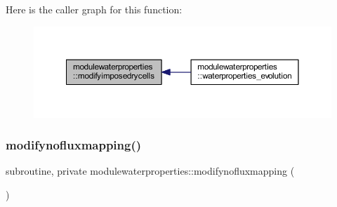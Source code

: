 Here is the caller graph for this function\+:\nopagebreak
\begin{figure}[H]
\begin{center}
\leavevmode
\includegraphics[width=350pt]{namespacemodulewaterproperties_aaeed6e345543d58d8feee181656796d0_icgraph}
\end{center}
\end{figure}
\mbox{\label{namespacemodulewaterproperties_a3d30e149ea4b3528ce74dea8162b347f}} 
\subsubsection{\texorpdfstring{modifynofluxmapping()}{modifynofluxmapping()}}
{\footnotesize\ttfamily subroutine, private modulewaterproperties\+::modifynofluxmapping (\begin{DoxyParamCaption}{ }\end{DoxyParamCaption})\hspace{0.3cm}{\ttfamily [private]}}


